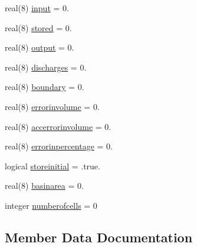 \begin{DoxyCompactItemize}
\item 
real(8) \mbox{\hyperlink{structmodulebasin_1_1t__basinwaterbalance_a474e9d424cec44bfe83aa2cbd2019937}{input}} = 0.
\item 
real(8) \mbox{\hyperlink{structmodulebasin_1_1t__basinwaterbalance_a7bd838f7b98ec89f6f1ef9bd05edbb51}{stored}} = 0.
\item 
real(8) \mbox{\hyperlink{structmodulebasin_1_1t__basinwaterbalance_af32131cf97696f7456dc0cea3527f79e}{output}} = 0.
\item 
real(8) \mbox{\hyperlink{structmodulebasin_1_1t__basinwaterbalance_a7ea19e825ec09998daa750ed600ae889}{discharges}} = 0.
\item 
real(8) \mbox{\hyperlink{structmodulebasin_1_1t__basinwaterbalance_aab55275b434b8c697a1af0e3e8c09f99}{boundary}} = 0.
\item 
real(8) \mbox{\hyperlink{structmodulebasin_1_1t__basinwaterbalance_a74dde57638d4d392badbb6f20df4fa99}{errorinvolume}} = 0.
\item 
real(8) \mbox{\hyperlink{structmodulebasin_1_1t__basinwaterbalance_aca422ccf9bdc03f3ba5ebc7663b204fb}{accerrorinvolume}} = 0.
\item 
real(8) \mbox{\hyperlink{structmodulebasin_1_1t__basinwaterbalance_a3c543e5902f2caed82f82b65ef726d56}{errorinpercentage}} = 0.
\item 
logical \mbox{\hyperlink{structmodulebasin_1_1t__basinwaterbalance_ac98aa579d7c116ea50c1ed181a51f85f}{storeinitial}} = .true.
\item 
real(8) \mbox{\hyperlink{structmodulebasin_1_1t__basinwaterbalance_af2f4e40316531e23f25d7c2e682da0aa}{basinarea}} = 0.
\item 
integer \mbox{\hyperlink{structmodulebasin_1_1t__basinwaterbalance_a076d884b076511e624198090e455c68e}{numberofcells}} = 0
\end{DoxyCompactItemize}


\subsection{Member Data Documentation}
\mbox{\label{structmodulebasin_1_1t__basinwaterbalance_aca422ccf9bdc03f3ba5ebc7663b204fb}} 
